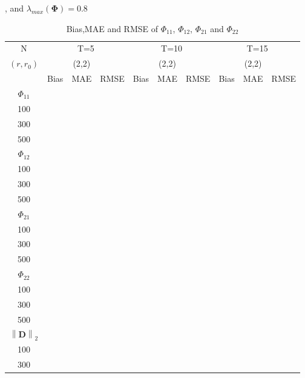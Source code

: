 \documentclass[12pt,a4paper,hyperref]{article}
\begin{document}
\begin{table}[H]
\caption{Bias,MAE and RMSE of $\Phi_{11}$, $\Phi_{12}$, $\Phi_{21}$ and $\Phi_{22}$}, and $\lambda_{max}(\boldsymbol{\Phi})=0.8$    \label{table1}
\centering
\tabcolsep=0.11cm
\begin{threeparttable}
\begin{tabular} {*{10}{c}}
\toprule
N& \multicolumn{3}{c}{T=5}&\multicolumn{3}{c}{T=10}&\multicolumn{3}{c}{T=15}\\
\cmidrule(lr){1-10}
$(r,r_{0})$ &   &(2,2)  &  &   &(2,2)  & &  &(2,2) & \\
\cmidrule(lr){1-4} \cmidrule(lr){5-7}\cmidrule(lr){8-10}
& \multicolumn{1}{c}{Bias} &\multicolumn{1}{c}{MAE}& \multicolumn{1}{c}{RMSE}&\multicolumn{1}{c}{Bias} &\multicolumn{1}{c}{MAE}& \multicolumn{1}{c}{RMSE}&\multicolumn{1}{c}{Bias}&\multicolumn{1}{c}{MAE} & \multicolumn{1}{c}{RMSE}\\
  \cmidrule(lr){2-4} \cmidrule(lr){5-7} \cmidrule(lr){8-10}
 $\Phi_{11}$\\
\cmidrule(lr){1-10}
100&  & & &	  &	& & & &   \\
300&   &  & &	  &	&	& & &  \\
500& &  &   &	  &	& & & &	  \\
\cmidrule(lr){1-10}
$\Phi_{12}$\\
\cmidrule(lr){1-4}   \cmidrule(lr){5-7}   \cmidrule(lr){8-10}
  100&  & & &	  &	& & & &   \\
300&   &  & &	  &	&	& & &  \\
500& &  &   &	  &	& & & &	  \\
\cmidrule(lr){1-10}
$\Phi_{21}$\\
\cmidrule(lr){1-4}   \cmidrule(lr){5-7}   \cmidrule(lr){8-10}
 100&  & & &	  &	& & & &   \\
300&   &  & &	  &	&	& & &  \\
500& &  &   &	  &	& & & &	  \\
\cmidrule(lr){1-10}
$\Phi_{22}$\\
\cmidrule(lr){1-4}   \cmidrule(lr){5-7}   \cmidrule(lr){8-10}
 100&  & & &	  &	& & & &   \\
300&   &  & &	  &	&	& & &  \\
500& &  &   &	  &	& & & &	  \\
\cmidrule(lr){1-10}
$\left\| \boldsymbol{D} \right\|_{2} $\\
\cmidrule(lr){1-4}   \cmidrule(lr){5-7}   \cmidrule(lr){8-10}
100&  & & &	  &	& & & &   \\
300&   &  & &	  &	&	& & &  \\

\end{tabular}
\end{threeparttable}
\end{table}
\end{document}
